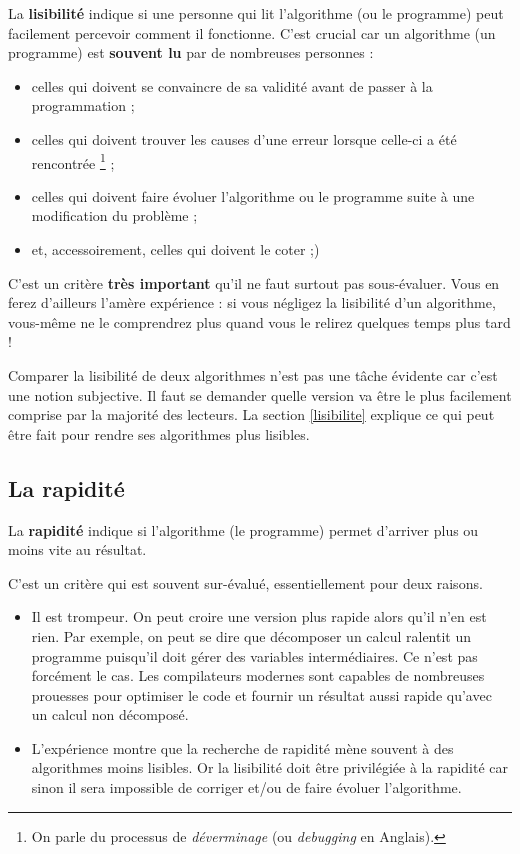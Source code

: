 			La \textbf{lisibilité}
			indique si une personne qui lit l'algorithme
			(ou le programme)
			peut facilement percevoir comment il fonctionne.
			C'est crucial car un algorithme (un programme) 
			est \textbf{souvent lu} par de nombreuses personnes :
			\begin{itemize}
			\item
				celles qui doivent se convaincre de sa validité
				avant de passer à la programmation ;
			\item
				celles qui doivent trouver les causes
				d'une erreur lorsque celle-ci a été rencontrée%
				\footnote{%
					On parle du processus de \emph{déverminage}
					(ou \emph{debugging} en Anglais).%
				} ;
			\item
				celles qui doivent faire évoluer l'algorithme
				ou le programme suite à une modification
				du problème ;
			\item
				et, accessoirement, celles qui doivent le coter ;)
			\end{itemize}
			
			C'est un critère \textbf{très important}
			qu'il ne faut surtout pas sous-évaluer.
			Vous en ferez d'ailleurs l'amère expérience :
			si vous négligez la lisibilité d'un algorithme,
			vous-même ne le comprendrez plus quand vous le relirez
			quelques temps plus tard !
			
			Comparer la lisibilité de deux algorithmes
			n'est pas une tâche évidente car c'est une notion subjective.
			Il faut se demander quelle version va être le plus facilement
			comprise par la majorité des lecteurs.		
			La section \vref{lisibilite}
			explique ce qui peut être fait pour rendre ses algorithmes
			plus lisibles.
				
		\subsection{La rapidité}
	    
			La \textbf{rapidité}
			indique si l'algorithme (le programme)
			permet d'arriver plus ou moins vite au résultat.
			
			C'est un critère qui est souvent sur-évalué, 
			essentiellement pour deux raisons.
			\begin{itemize}
				\item 
					Il est trompeur. 
					On peut croire une version plus rapide alors qu'il n'en est rien.
					Par exemple, on peut se dire que décomposer un calcul
					ralentit un programme puisqu'il doit gérer des variables
					intermédiaires.
					Ce n'est pas forcément le cas.
					Les compilateurs modernes sont capables
					de nombreuses prouesses pour optimiser le code
					et fournir un résultat aussi rapide
					qu'avec un calcul non décomposé.
				\item
					L'expérience montre que la recherche de rapidité
					mène souvent à des algorithmes moins lisibles.
					Or la lisibilité doit être privilégiée à la rapidité
					car sinon il sera impossible de corriger et/ou
					de faire évoluer l'algorithme.
			\end{itemize}
		
